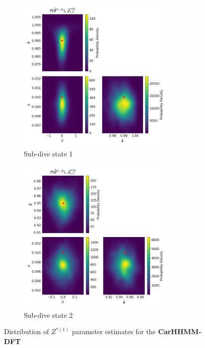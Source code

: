 \documentclass[12pt]{TD-CJS}
\begin{document}
\begin{figure}[ht]
	\centering
	\begin{subfigure}[t]{\textwidth}
        \centering
        \includegraphics[height=3in]{../Plots/hhmm_FV_MLE_density_A_0_0.png}
        \caption{Sub-dive state 1}
    \end{subfigure}
    \newline
    \begin{subfigure}[t]{\textwidth}
        \centering
        \includegraphics[height=3in]{../Plots/hhmm_FV_MLE_density_A_0_1.png}
        \caption{Sub-dive state 2}
    \end{subfigure}
    \caption{Distribution of $Z^{*(1)}$ parameter estimates for the \textbf{CarHHMM-DFT}}
\end{figure}
\end{document}
